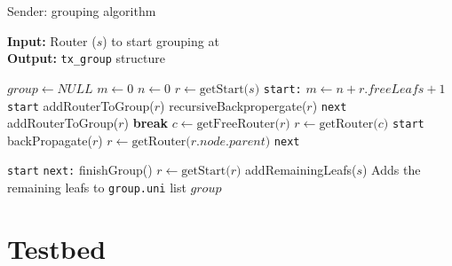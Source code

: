 \begin{algorithm}
    \caption{Sender: grouping algorithm}\label{alg:sender_grouping}
    \hspace*{\algorithmicindent} \textbf{Input:} Router ($s$) to start grouping at\\
    \hspace*{\algorithmicindent} \textbf{Output:} \texttt{tx\_group} structure\\
\begin{algorithmic}[1]
\State $group\gets NULL$
\State $m\gets 0$
\State $n\gets 0$
\State $r\gets \text{getStart($s$)}$
\Label \texttt{start:}
        \State $m\gets n + r.freeLeafs + 1$
            \State \Goto \texttt{start}
            \State addRouterToGroup($r$)
            \State recursiveBackpropergate($r$)
            \State \Goto \texttt{next}
            \State addRouterToGroup($r$)
            \State \textbf{break}
        \EndIf
    \EndWhile
        \State $c\gets \text{getFreeRouter($r$)}$
            \State $r\gets \text{getRouter($c$)}$
            \State \Goto \texttt{start}
        \EndIf
    \EndWhile
        \State backPropagate($r$)
        \State $r\gets \text{getRouter($r.node.parent$)}$
            \State \Goto \texttt{next}
        \EndIf

        \State \Goto \texttt{start}
    \EndIf
\Label \texttt{next:}
    \State finishGroup()
    \State $r\gets \text{getStart($r$)}$
\EndWhile
    \State addRemainingLeafs($s$)
    \Comment Adds the remaining leafs to \texttt{group.uni} list 
    \State \Return $group$
\end{algorithmic}
\end{algorithm}

\newpage 

\section{Testbed} %
\label{sec:Testbed_Implementation}

